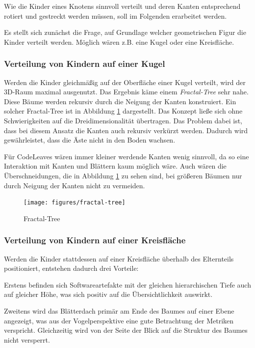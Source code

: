 Wie die Kinder eines Knotens sinnvoll verteilt und deren Kanten entsprechend rotiert und gestreckt werden müssen, soll im Folgenden erarbeitet werden.

Es stellt sich zunächst die Frage, auf Grundlage welcher geometrischen Figur die Kinder verteilt werden. Möglich wären z.B. eine Kugel oder eine Kreisfläche.

\subsubsection*{Verteilung von Kindern auf einer Kugel}
Werden die Kinder gleichmäßig auf der Oberfläche einer Kugel verteilt, wird der 3D-Raum maximal ausgenutzt. Das Ergebnis käme einem \textit{Fractal-Tree} sehr nahe. Diese Bäume werden rekursiv durch die Neigung der Kanten konstruiert. Ein solcher Fractal-Tree ist in Abbildung \ref{fig:fractal-tree} dargestellt. Das Konzept ließe sich ohne Schwierigkeiten auf die Dreidimensionalität übertragen. Das Problem dabei ist, dass bei diesem Ansatz die Kanten auch rekursiv verkürzt werden. Dadurch wird gewährleistet, dass die Äste nicht in den Boden wachsen.

Für CodeLeaves wären immer kleiner werdende Kanten wenig sinnvoll, da so eine Interaktion mit Kanten und Blättern kaum möglich wäre. Auch wären die Überschneidungen, die in Abbildung \ref{fig:fractal-tree} zu sehen sind, bei größeren Bäumen nur durch Neigung der Kanten nicht zu vermeiden.

\begin{figure}[htb]
  \texttt{[image: figures/fractal-tree]}
  \caption{Fractal-Tree \cite{rocchini2017fractal}}
  \label{fig:fractal-tree}
\end{figure}

\subsubsection*{Verteilung von Kindern auf einer Kreisfläche}
Werden die Kinder stattdessen auf einer Kreisfläche überhalb des Elternteils positioniert, entstehen dadurch drei Vorteile:

Erstens befinden sich Softwareartefakte mit der gleichen hierarchischen Tiefe auch auf gleicher Höhe, was sich positiv auf die Übersichtlichkeit auswirkt.

Zweitens wird das Blätterdach primär am Ende des Baumes auf einer Ebene angezeigt, was aus der Vogelperspektive eine gute Betrachtung der Metriken verspricht. Gleichzeitig wird von der Seite der Blick auf die Struktur des Baumes nicht versperrt.


